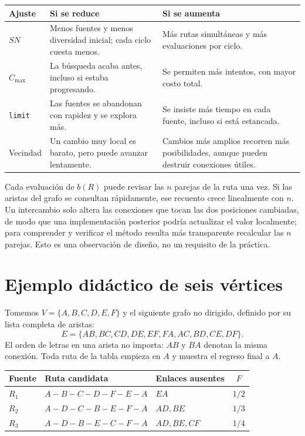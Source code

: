 \documentclass[11pt,letterpaper]{article}
\begin{document}
\begin{center}
\small
\begin{tabular}{p{2.5cm}p{5.0cm}p{5.0cm}}
\toprule
\textbf{Ajuste} & \textbf{Si se reduce} & \textbf{Si se aumenta}\\
\midrule
$SN$ & Menos fuentes y menos diversidad inicial; cada ciclo cuesta menos. & Más rutas simultáneas y más evaluaciones por ciclo.\\
$C_{\max}$ & La búsqueda acaba antes, incluso si estaba progresando. & Se permiten más intentos, con mayor costo total.\\
\texttt{limit} & Las fuentes se abandonan con rapidez y se explora más. & Se insiste más tiempo en cada fuente, incluso si está estancada.\\
Vecindad & Un cambio muy local es barato, pero puede avanzar lentamente. & Cambios más amplios recorren más posibilidades, aunque pueden destruir conexiones útiles.\\
\bottomrule
\end{tabular}
\end{center}

Cada evaluación de $b(R)$ puede revisar las $n$ parejas de la ruta una vez. Si las aristas del grafo se consultan rápidamente, ese recuento crece linealmente con $n$. Un intercambio solo altera las conexiones que tocan las dos posiciones cambiadas, de modo que una implementación posterior podría actualizar el valor localmente; para comprender y verificar el método resulta más transparente recalcular las $n$ parejas. Esto es una observación de diseño, no un requisito de la práctica.

\section{Ejemplo didáctico de seis vértices}\label{sec:ejemplo}
Tomemos $V=\{A,B,C,D,E,F\}$ y el siguiente grafo no dirigido, definido por su lista completa de aristas:
\[
E=\{AB,BC,CD,DE,EF,FA,AC,BD,CE,DF\}.
\]
El orden de letras en una arista no importa: $AB$ y $BA$ denotan la misma conexión. Toda ruta de la tabla empieza en $A$ y muestra el regreso final a $A$.

\begin{center}
\small
\begin{tabular}{p{1.5cm}p{7.2cm}p{3.3cm}c}
\toprule
\textbf{Fuente} & \textbf{Ruta candidata} & \textbf{Enlaces ausentes} & $F$\\
\midrule
$R_1$ & $A-B-C-D-F-E-A$ & $EA$ & $1/2$\\
$R_2$ & $A-D-C-B-E-F-A$ & $AD,BE$ & $1/3$\\
$R_3$ & $A-D-B-E-C-F-A$ & $AD,BE,CF$ & $1/4$\\
\bottomrule
\end{tabular}
\end{center}
\end{document}
